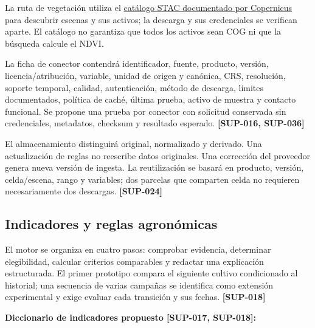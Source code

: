 \documentclass[10pt,a4paper]{article}
\begin{document}
La ruta de vegetación utiliza el \href{https://documentation.dataspace.copernicus.eu/APIs/STAC.html}{catálogo STAC documentado por Copernicus} para descubrir escenas y sus activos; la descarga y sus credenciales se verifican aparte. El catálogo no garantiza que todos los activos sean COG ni que la búsqueda calcule el NDVI.


La ficha de conector contendrá identificador, fuente, producto, versión, licencia/\allowbreak{}atribución, variable, unidad de origen y canónica, CRS, resolución, soporte temporal, calidad, autenticación, método de descarga, límites documentados, política de caché, última prueba, activo de muestra y contacto funcional. Se propone una prueba por conector con solicitud conservada sin credenciales, metadatos, checksum y resultado esperado. \textbf{[SUP-016, SUP-036]}


El almacenamiento distinguirá original, normalizado y derivado. Una actualización de reglas no reescribe datos originales. Una corrección del proveedor genera nueva versión de ingesta. La reutilización se basará en producto, versión, celda/\allowbreak{}escena, rango y variables; dos parcelas que comparten celda no requieren necesariamente dos descargas. \textbf{[SUP-024]}


\subsection{Indicadores y reglas agronómicas}

El motor se organiza en cuatro pasos: comprobar evidencia, determinar elegibilidad, calcular criterios comparables y redactar una explicación estructurada. El primer prototipo compara el siguiente cultivo condicionado al historial; una secuencia de varias campañas se identifica como extensión experimental y exige evaluar cada transición y sus fechas. \textbf{[SUP-018]}


\textbf{Diccionario de indicadores propuesto [SUP-017, SUP-018]:}
\end{document}
